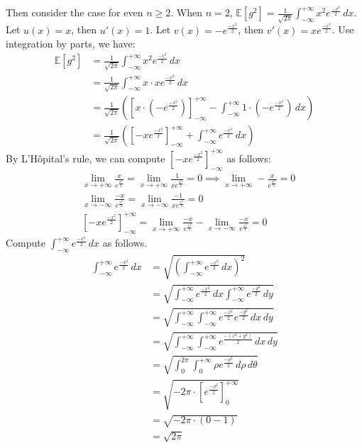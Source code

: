 Then consider the case for even $n \ge 2$.
When $n=2$, $\mathbb{E}[g^2]=\frac{1}{\sqrt{2\pi}}\int_{-\infty }^{+\infty }x^2e^{\frac{-x^2}{2}}\,dx $.
Let $u(x)=x$, then $u'(x)=1$.
Let $v(x)=-e^{\frac{-x^2}{2}}$, then $v'(x)=xe^{\frac{-x^2}{2}}$. Use integration by parts, we have:
\begin{align}
    \nonumber \mathbb{E}[g^2]&=\frac{1}{\sqrt{2\pi}}\int_{-\infty }^{+\infty }x^2e^{\frac{-x^2}{2}}\,dx\\
    \nonumber &=\frac{1}{\sqrt{2\pi}}\int_{-\infty }^{+\infty }x\cdot xe^{\frac{-x^2}{2}}\,dx\\
    \nonumber &=\frac{1}{\sqrt{2\pi}}([x\cdot (-e^{\frac{-x^2}{2}})]_{-\infty}^{+\infty}-\int_{-\infty }^{+\infty }1\cdot (-e^{\frac{-x^2}{2}})\,dx )\\
    \nonumber &=\frac{1}{\sqrt{2\pi}}([-xe^{\frac{-x^2}{2}}]_{-\infty}^{+\infty}+\int_{-\infty }^{+\infty }e^{\frac{-x^2}{2}}\,dx )
\end{align}
By L'Hôpital's rule, we can compute $[-xe^{\frac{-x^2}{2}}]_{-\infty}^{+\infty}$ as follows:
\begin{align}
    \nonumber &\lim\limits_{x\to+\infty}   \frac{x}{e^{\frac{x^2}{2}}}=  \lim\limits_{x\to+\infty}\frac{1}{xe^{\frac{x^2}{2}}}=0 \implies \lim\limits_{x\to+\infty}   -\frac{x}{e^{\frac{x^2}{2}}}=0\\
    \nonumber &\lim\limits_{x\to-\infty}   \frac{-x}{e^{\frac{x^2}{2}}}=\lim\limits_{x\to-\infty}\frac{-1}{xe^{\frac{x^2}{2}}}=0\\
    \nonumber & [-xe^{\frac{-x^2}{2}}]_{-\infty}^{+\infty}=\lim\limits_{x\to+\infty}\frac{-x}{e^{\frac{x^2}{2}}}   -\lim\limits_{x\to-\infty} \frac{-x}{e^{\frac{x^2}{2}}}=0
\end{align}
Compute $\int_{-\infty }^{+\infty }e^{\frac{-x^2}{2}}\,dx $ as follows.
\begin{align}
    \nonumber \int_{-\infty }^{+\infty }e^{\frac{-x^2}{2}}\,dx &=\sqrt{(\int_{-\infty }^{+\infty }e^{\frac{-x^2}{2}}\,dx )^2}\\
    \nonumber &=\sqrt{\int_{-\infty }^{+\infty }e^{\frac{-x^2}{2}}\,dx \int_{-\infty }^{+\infty }e^{\frac{-y^2}{2}}\,dy}\\
    \nonumber &=\sqrt{\int_{-\infty }^{+\infty }\int_{-\infty }^{+\infty }e^{\frac{-x^2}{2}}e^{\frac{-y^2}{2}}\,dx\,dy}\\
    \nonumber &=\sqrt{\int_{-\infty }^{+\infty }\int_{-\infty }^{+\infty }e^{\frac{-(x^2+y^2)}{2}}\,dx\,dy}\\
    \nonumber &=\sqrt{\int_{0}^{2\pi}\int_{0 }^{+\infty }\rho e^{\frac{-\rho^2}{2}}\,d\rho\,d\theta }\\
    \nonumber &=\sqrt{-2\pi\cdot[e^{\frac{-\rho^2}{2}}]_{0}^{+\infty}}\\
    \nonumber &=\sqrt{-2\pi\cdot(0-1)}\\
    \nonumber &=\sqrt{2\pi}
\end{align}
